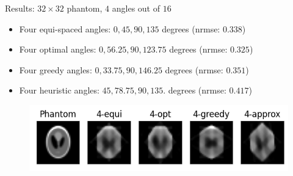 \documentclass[english,aspectratio=43]{beamer}
\begin{document}
\begin{frame}{Results: $32 \times 32$ phantom, $4$ angles out of $16$ }
	\begin{itemize}
	    \item Four equi-spaced angles: $0, 45, 90, 135$ degrees (nrmse: $0.338$)
	    \item Four optimal angles: $ 0, 56.25,  90, 123.75$ degrees (nrmse: $0.325$)
	    \item Four greedy angles: $0, 33.75, 90, 146.25$ degrees (nrmse: $0.351$)
	    \item Four heuristic angles: $45, 78.75,  90, 135.$ degrees (nrmse: $0.417$)
        
	\end{itemize}
	
	\begin{figure}
    \includegraphics[scale=0.9]{Figs/plot_recon_compare3_32-16-4.png}
    \end{figure}
	
\end{frame}
\end{document}
